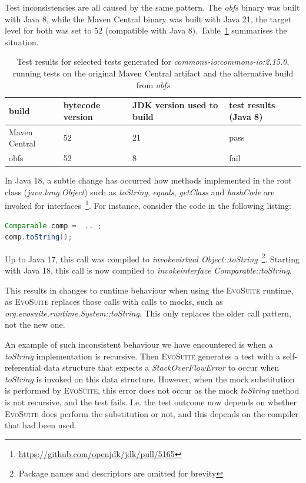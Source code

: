 \documentclass[conference]{IEEEtran}
\makeatletter
\newcommand{\evosuite}{\textsc{EvoSuite}\@\xspace}
\makeatother
\begin{document}
Test inconsistencies are all caused by the same pattern.  The \textit{obfs} binary was built  with Java 8, while the Maven Central binary was built with Java 21, the target level for both was set to 52 (compatible with Java 8). Table~\ref{tab:stackoverflow} summarises the situation.


\begin{table}[h]
	\begin{tabular}{|p{2.0cm}p{1.2cm}p{1.5cm}p{1.3cm}|}
		\hline
		build         & bytecode version & JDK version used to build & test results (Java 8)                                            \\ \hline 
		Maven Central & 52       & 21                        & pass                                                                                        \\
		obfs         & 52               & 8                        & fail              \\ \hline
	\end{tabular}
	\caption{Test results for selected tests generated for  \textit{commons-io:commons-io:2.15.0}, running tests on the original Maven Central artifact and the alternative build from \textit{obfs}}
	\label{tab:stackoverflow}
\end{table}

In Java 18, a subtle change has occurred   how methods implemented in the root class (\textit{java.lang.Object}) such as \textit{toString}, \textit{equals}, \textit{getClass} and \textit{hashCode} are invoked for interfaces~\footnote{\url{https://github.com/openjdk/jdk/pull/5165}}.
For instance, consider the code in the following listing:

\begin{lstlisting}[language=Java]
Comparable comp =  .. ; 
comp.toString();
\end{lstlisting}	

Up to Java 17, this call was compiled to \textit{invokevirtual Object::toString}~\footnote{Package names and descriptors are omitted for brevity}. Starting with Java 18, this call is now compiled to \textit{invokeinterface Comparable::toString}.

This results in changes to runtime behaviour when using the \evosuite runtime, as \evosuite replaces those calls with calls to mocks, such as  \textit{org.evosuite.runtime.System::toString}. This only replaces the older call pattern, not the new one. 

An example of such inconsistent behaviour we have encountered  is when a \textit{toString} implementation is recursive. Then \evosuite generates a test with a self-referential data structure that expects a \textit{StackOverFlowError} to occur when \textit{toString} is invoked on this data structure. However, when the mock substitution is performed by \evosuite, this error does not occur as the mock \textit{toString} method is not recursive, and the test fails. I.e. the test outcome now depends on whether \evosuite does perform the substitution or not, and this depends on the compiler that had been used.
\end{document}
